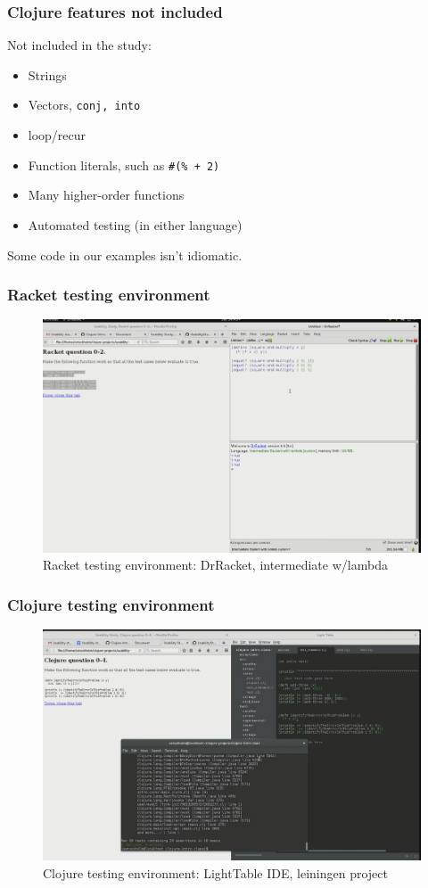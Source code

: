 \documentclass{beamer}
\begin{document}
\begin{frame}
\frametitle{ Clojure features not included}
Not included in the study:
\begin{itemize}
\item Strings 
\item Vectors, {\tt conj, into}
\item loop/recur
\item Function literals, such as {\tt \#(\% + 2)} 
\item Many higher-order functions
\item Automated testing (in either language)
\end{itemize}
Some code in our examples isn't idiomatic. 
\end{frame}

\begin{frame}
\frametitle{Racket testing environment}
\begin{figure}
\includegraphics[height=0.75\textheight]{RacketEnvironment.png}
\caption{Racket testing environment: DrRacket,  intermediate w/lambda}
\end{figure}
\end{frame}


\begin{frame}
\frametitle{Clojure testing environment}
\begin{figure}
\includegraphics[height=0.75\textheight]{ClojureEnvironment.png}
\caption{Clojure testing environment: LightTable IDE, leiningen project }
\end{figure}
\end{frame}
\end{document}

